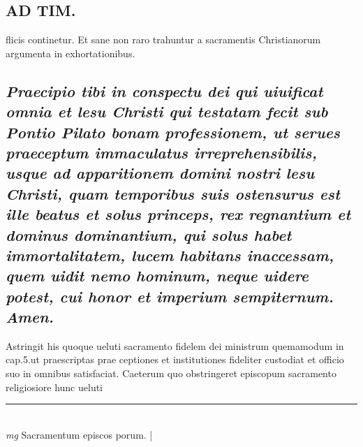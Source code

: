 \documentclass{article}
\begin{document}
\begin{pages}
\section*{AD TIM. }
\marginpar{[ p.171 ]}\pstart flicis continetur. Et sane non raro trahuntur a sacramentis Christianorum argumenta in exhortationibus.  \pend
{}
{}
\subsection*{\textit{Praecipio tibi in conspectu dei qui uiuificat omnia et lesu Christi qui testatam fecit sub Pontio Pilato bonam professionem, ut serues praeceptum immaculatus irreprehensibilis, usque ad apparitionem domini nostri lesu Christi, quam temporibus suis ostensurus est ille beatus et solus princeps, rex regnantium et dominus dominantium, qui solus habet immortalitatem, lucem habitans inaccessam, quem uidit nemo hominum, neque  uidere potest, cui honor et imperium sempiternum. Amen. }}\pstart Astringit his quoque ueluti sacramento fidelem dei ministrum quemamodum in cap.5.ut praescriptas prae ceptiones et institutiones fideliter custodiat et officio suo in omnibus satisfaciat. Caeterum quo obstringeret episcopum sacramento religiosiore hunc ueluti  \pend
\vspace{0.5cm}\noindent
\vspace{0.2cm}\rule{1cm}{0.2pt}\\ 
\hspace{0.2cm}\textit{mg}
\footnotesize Sacramentum episcos porum. 
\normalsize| 

\end{pages}
\end{document}
